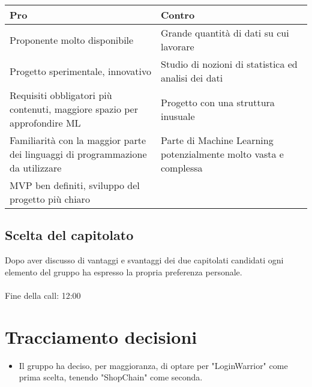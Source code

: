 \begin{tabular}{|p{0.50\linewidth}|p{0.50 \linewidth}|}
	\hline
	\textbf{Pro} & \textbf{Contro}                                                                                                                                             \\
	\hline
	Proponente molto disponibile & Grande quantità di dati su cui lavorare \\
	\hline
	Progetto sperimentale, innovativo & Studio di nozioni di statistica ed analisi dei dati \\
	\hline
	Requisiti obbligatori più contenuti, maggiore spazio per approfondire ML & Progetto con una struttura inusuale\\
	\hline
	Familiarità con la maggior parte dei linguaggi di programmazione da utilizzare& Parte di Machine Learning potenzialmente molto vasta e complessa\\
	\hline
	MVP ben definiti, sviluppo del progetto più chiaro&\\
	\hline
\end{tabular}
\subsection{Scelta del capitolato}
Dopo aver discusso di vantaggi e svantaggi dei due capitolati candidati ogni elemento del gruppo ha espresso la propria preferenza personale.\\
\\\noindent
Fine della call: 12:00

\section{Tracciamento decisioni}
\begin{itemize}
	\item Il gruppo ha deciso, per maggioranza, di optare per "LoginWarrior" come prima scelta, tenendo "ShopChain" come seconda.
\end{itemize}
